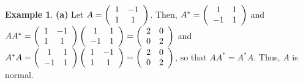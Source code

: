\documentclass[numbers=enddot,12pt,final,onecolumn,notitlepage]{scrartcl}%
\numberwithin{exer}{subsection}
\theoremstyle{definition}
\newtheorem{exam}[theo]{Example}
\begin{document}
\begin{exam}
\textbf{(a)} Let $A=\left(
\begin{array}
[c]{cc}%
1 & -1\\
1 & 1
\end{array}
\right)  $. Then, $A^{\ast}=\left(
\begin{array}
[c]{cc}%
1 & 1\\
-1 & 1
\end{array}
\right)  $ and $AA^{\ast}=\left(
\begin{array}
[c]{cc}%
1 & -1\\
1 & 1
\end{array}
\right)  \left(
\begin{array}
[c]{cc}%
1 & 1\\
-1 & 1
\end{array}
\right)  =\allowbreak\left(
\begin{array}
[c]{cc}%
2 & 0\\
0 & 2
\end{array}
\right)  $ and $A^{\ast}A=\left(
\begin{array}
[c]{cc}%
1 & 1\\
-1 & 1
\end{array}
\right)  \left(
\begin{array}
[c]{cc}%
1 & -1\\
1 & 1
\end{array}
\right)  =\allowbreak\left(
\begin{array}
[c]{cc}%
2 & 0\\
0 & 2
\end{array}
\right)  $, so that $AA^{\ast}=A^{\ast}A$. Thus, $A$ is normal.


\end{exam}
\end{document}
